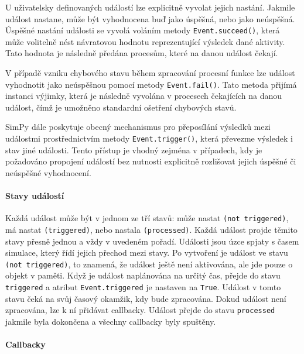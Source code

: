\documentclass[
  program=itp,
  biblatex,
  figures=false,
  glossaries,
  index
]{kidiplom}
\begin{document}
U uživatelsky definovaných událostí lze explicitně vyvolat jejich nastání. Jakmile událost nastane, může být vyhodnocena buď jako úspěšná, nebo jako neúspěšná. Úspěšné nastání události se vyvolá voláním metody \texttt{Event.succeed()}, která může volitelně nést návratovou hodnotu reprezentující výsledek dané aktivity. Tato hodnota je následně předána procesům, které na danou událost čekají.

V případě vzniku chybového stavu během zpracování procesní funkce lze událost vyhodnotit jako neúspěšnou pomocí metody \texttt{Event.fail()}. Tato metoda přijímá instanci výjimky, která je následně vyvolána v procesech čekajících na danou událost, čímž je umožněno standardní ošetření chybových stavů.

SimPy dále poskytuje obecný mechanismus pro přeposílání výsledků mezi událostmi prostřednictvím metody \texttt{Event.trigger()}, která převezme výsledek i stav jiné události. Tento přístup je vhodný zejména v případech, kdy je požadováno propojení událostí bez nutnosti explicitně rozlišovat jejich úspěšné či neúspěšné vyhodnocení.

\paragraph{Stavy událostí}

Každá událost může být v jednom ze tří stavů: může nastat \texttt{(not triggered)}, má nastat \texttt{(triggered)}, nebo nastala \texttt{(processed)}. Každá událost projde těmito stavy přesně jednou a vždy v uvedeném pořadí. Události jsou úzce spjaty s časem simulace, který řídí jejich přechod mezi stavy. Po vytvoření je událost ve stavu \texttt{(not triggered)}, to znamená, že událost ještě není aktivována, ale jde pouze o objekt v paměti. Když je událost naplánována na určitý čas, přejde do stavu \texttt{triggered} a atribut \texttt{Event.triggered} je nastaven na \texttt{True}. Událost v tomto stavu čeká na svůj časový okamžik, kdy bude zpracována. Dokud událost není zpracována, lze k ní přidávat callbacky. Událost přejde do stavu  \texttt{processed} jakmile byla dokončena a všechny callbacky byly spuštěny.

\paragraph{Callbacky}
\end{document}
